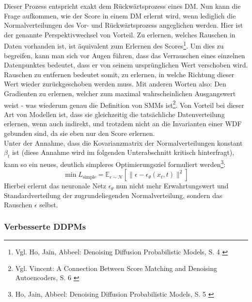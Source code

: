Dieser Prozess entspricht exakt dem Rückwärtsprozess eines \ac{DM}. Nun kann die Frage aufkommen, wie der Score in einem \ac{DM} erlernt wird, wenn lediglich die Normalverteilungen des Vor- und Rückwärtsprozess angeglichen werden. Hier ist der genannte Perspektivwechsel von Vorteil. Zu erlernen, welches Rauschen in Daten vorhanden ist, ist äquivalent zum Erlernen des Scores\footnote{
    Vgl. Ho, Jain, Abbeel: Denoising Diffusion Probabilistic Models, S. 4
    \cite{ho2020denoisingdiffusionprobabilisticmodels}
}. Um dies zu begreifen, kann man sich vor Augen führen, dass das Verrauschen eines einzelnen Datenpunktes bedeutet, dass er von seinem ursprünglichen Wert verschoben wird. Rauschen zu entfernen bedeutet somit, zu erlernen, in welche Richtung dieser Wert wieder zurückgeschoben werden muss. Mit anderen Worten also: Den Gradienten zu erlernen, welcher zum maximal wahrscheinlichen Ausgangswert weist - was wiederum genau die Definition von \ac{SMM}s ist\footnote{
    Vgl. Vincent: A Connection Between Score Matching and Denoising Autoencoders, S. 6
    \cite{vincent2011connection}
}. Von Vorteil bei dieser Art von Modellen ist, dass sie gleichzeitig die tatsächliche Datenverteilung erlernen, wenn auch indirekt, und trotzdem nicht an die Invarianten einer \ac{WDF} gebunden sind, da sie eben nur den Score erlernen. \\
Unter der Annahme, dass die Kovarianzmatrix der Normalverteilungen konstant $\beta_t$ ist (diese Annahme wird im folgenden Unterabschnitt kritisch hinterfragt), kann so ein neues, deutlich simpleres Optimierungsziel formuliert werden\footnote{
    Ho, Jain, Abbeel: Denoising Diffusion Probabilistic Models, S. 5
    \cite{ho2020denoisingdiffusionprobabilisticmodels}
}: 
\begin{equation}
    \min L_\text{simple} = \mathbb E_{\epsilon \sim \mathcal N}
    \left [
        \| \epsilon - \epsilon_\theta(x_{t}, t) \|^2
    \right ]
\end{equation}
Hierbei erlernt das neuronale Netz $\epsilon_\theta$ nun nicht mehr Erwahrtungswert und Standardverteilung der zugrundeliegenden Normalverteilung, sondern das Rauschen $\epsilon$ selbst. 

\subsubsection{Verbesserte DDPMs}

